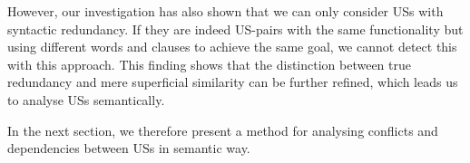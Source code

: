 However, our investigation has also shown that we can only consider USs with syntactic redundancy. If they are indeed US-pairs with the same functionality but using different words and clauses to achieve the same goal, we cannot detect this with this approach. This finding shows that the distinction between true redundancy and mere superficial similarity can be further refined, which leads us to analyse USs semantically.

In the next section, we therefore present a method for analysing conflicts and dependencies between USs in semantic way.

%
